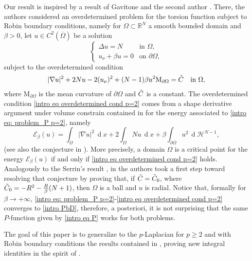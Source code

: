 \documentclass[10pt,a4paper]{amsart}
\numberwithin{equation}{section}
\newcommand{\R}{\mathbb{R}}
\renewcommand{\d}[1]{\ensuremath{\operatorname{d}\!{#1}}}
\begin{document}
Our result is inspired by a result of Gavitone and the second author \cite{gamo26}. There, the authors considered an overdetermined problem for the torsion function subject to Robin boundary conditions, namely for $\Omega \subset \R^N$ a smooth bounded domain and $\beta > 0$, let $u \in C^2(\overline{\Omega})$ be a solution
\begin{equation} \label{intro eq: problem_P p=2}
    \begin{cases}
    \Delta u = N & \text{in } \Omega, \\
    u_\nu  + \beta u = 0 & \text{on } \partial\Omega,
    \end{cases}
\end{equation}
subject to the overdetermined condition
\begin{equation}\label{intro eq overdetermined cond p=2}
    |\nabla u|^2 + 2Nu - 2(u_\nu)^2 + (N-1) \beta u^2 \mathrm{M}_{\partial\Omega} = \Tilde{C} \quad \text{in } \Omega,
\end{equation}
where $\mathrm{M}_{\partial\Omega}$ is the mean curvature of $\partial \Omega$ and $\Tilde{C}$ is a constant. The overdetermined condition \eqref{intro eq overdetermined cond p=2} comes from a shape derivative argument under volume constrain contained in \cite{bw} for the energy associated to \eqref{intro eq: problem_P p=2}, namely 
\begin{equation*}
    \mathcal{E}_{\beta}(u) = \int_{\Omega} |\nabla u|^2 \,\d{x} + 2 \int_{\Omega} N u \,\d x + \beta  \int_{\partial\Omega} u^2 \, \d{}\mathcal{H}^{N-1},
\end{equation*}
(see also the conjecture in \cite[Thm. 4.1 \& Ex. 4.1]{bw}). More precisely, a domain $\Omega$ is a critical point for the energy $ \mathcal{E}_{\beta}(u)$ if and only if \eqref{intro eq overdetermined cond p=2} holds. Analogously to the Serrin's result \cite{serrin}, in \cite{gamo26} the authors took a first step toward resolving that conjecture by proving that, if $\Tilde{C} = \Tilde{C}_0$, where $\Tilde{C}_0 = -R^{2} - \frac{R}{\beta} (N + 1)$, then $\Omega$ is a ball and $u$ is radial. Notice that, formally for $\beta \to +\infty$, \eqref{intro eq: problem_P p=2}-\eqref{intro eq overdetermined cond p=2} converges to \eqref{intro PbD}, therefore, a posteriori, it is not surprising that the same $P$-function given by \eqref{intro eq P} works for both problems.

The goal of this paper is to generalize to the $p$-Laplacian for $p \geq 2$ and with Robin boundary conditions the results contained in \cite{gamo26}, proving new integral identities in the spirit of \cite{mapo19,mp2020,mp23}. 
\end{document}
